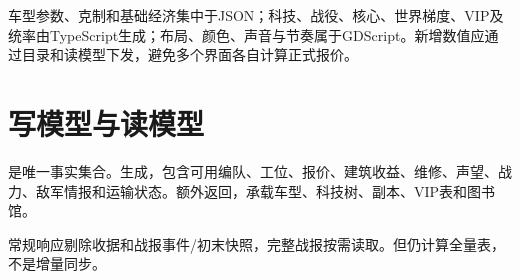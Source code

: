 车型参数、克制和基础经济集中于JSON；科技、战役、核心、世界梯度、VIP及统率由TypeScript生成；布局、颜色、声音与节奏属于GDScript。新增数值应通过目录和读模型下发，避免多个界面各自计算正式报价。

\section{写模型与读模型}
是唯一事实集合。生成，包含可用编队、工位、报价、建筑收益、维修、声望、战力、敌军情报和运输状态。额外返回，承载车型、科技树、副本、VIP表和图书馆。

常规响应剔除收据和战报事件/初末快照，完整战报按需读取。但仍计算全量表，不是增量同步。
